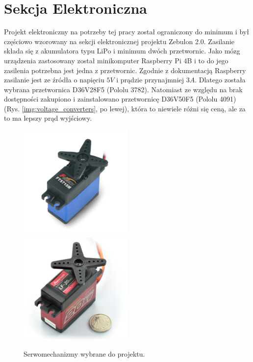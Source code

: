 \chapter{Sekcja Elektroniczna}
Projekt elektroniczny na potrzeby tej pracy został ograniczony do minimum i był częściowo wzorowany na sekcji elektronicznej projektu Zebulon 2.0. Zasilanie składa się z akumulatora typu LiPo i minimum dwóch przetwornic. Jako mózg urządzenia zastosowany został minikomputer Raspberry Pi 4B i to do jego zasilenia potrzebna jest jedna z przetwornic. Zgodnie z dokumentacją Raspberry zasilanie jest ze źródła o napięciu $5V$ i prądzie przynajmniej $3A$.\cite{RPI_power_sup} Dlatego została wybrana przetwornica D36V28F5 (Pololu 3782). Natomiast ze względu na brak dostępności zakupiono i  zainstalowano przetwornicę D36V50F5 (Pololu 4091) (Rys. \ref{img:voltage_converters}, po lewej), która to niewiele różni się ceną, ale za to ma lepszy prąd wyjściowy. \cite{polulu_step_down}\\

\begin{figure}[h!]
\includegraphics[width=0.5\textwidth]{img/feetech.png}
\includegraphics[width=0.5\textwidth]{img/powerhd.png}
\caption{Serwomechanizmy wybrane do projektu. \cite{feetech_docs} \cite{powerhd_docs}}
\label{img:servos}
\end{figure}

